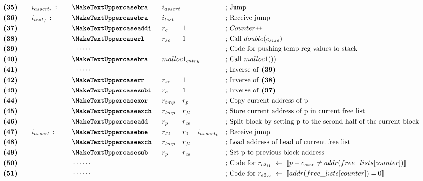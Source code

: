 \begin{figure}[ht]
{\begin{minipage}{\linewidth}
\begin{alignat*}{7}
    &\textbf{(35)}\quad&&i_{assert_t}\ \texttt{:}\quad &&\inst{bra} &&i_{assert} \span\omit\span\quad \span\omit\span\quad && \text{; Jump}\\
    &\textbf{(36)}\quad&&i_{test_f}\ \texttt{:}\quad &&\inst{bra} &&i_{test} \span\omit\span\quad \span\omit\span\quad && \text{; Receive jump}\\
    &\textbf{(37)}\quad&& &&\inst{addi} &&r_{c} && 1 && && \text{; $Counter\texttt{++}$}\\
    &\textbf{(38)}\quad&& &&\inst{rl} &&r_{sc}\ && 1 && && \text{; Call $double(c_{size}$)}\\
    &\textbf{(39)}\quad&& &&\cdots\cdots && && && &&\text{; Code for pushing temp reg values to stack}\\
    &\textbf{(40)}\quad&& &&\inst{bra}\quad &&malloc1_{entry} \span\omit\span\quad \span\omit\span\quad && \text{; Call $malloc1()$)}\\
    &\textbf{(41)}\quad&& &&\cdots\cdots && && && &&\text{; Inverse of \textbf{(39)}}\\
    &\textbf{(42)}\quad&& &&\inst{rr} &&r_{sc}\ && 1 && && \text{; Inverse of \textbf{(38)}}\\
    &\textbf{(43)}\quad&& &&\inst{subi} &&r_{c} && 1 && && \text{; Inverse of \textbf{(37)}}\\
    &\textbf{(44)}\quad&& &&\inst{xor} &&r_{tmp} && r_p && && \text{; Copy current address of p}\\
    &\textbf{(45)}\quad&& &&\inst{exch} &&r_{tmp} && r_{fl} && && \text{; Store current address of p in current free list}\\
    &\textbf{(46)}\quad&& &&\inst{add} &&r_{p} && r_{cs} && && \text{; Split block by setting p to the second half of the current block}\\
    &\textbf{(47)}\quad&&i_{assert}\ \texttt{:}\quad &&\inst{bne} &&r_{t2} && r_0 && i_{assert_t} && \text{; Receive jump}\\
    &\textbf{(48)}\quad&& &&\inst{exch} &&r_{tmp} && r_{fl} && && \text{; Load address of head of current free list}\\
    &\textbf{(49)}\quad&& &&\inst{sub} &&r_{p} && r_{cs} && && \text{; Set p to previous block address}\\
    &\textbf{(50)}\quad&& &&\cdots\cdots && && && &&\text{; Code for $r_{e2_{i1}}\ \leftarrow\ \llbracket p - c_{size} \neq addr(free\_lists[counter])\rrbracket$}\\
    &\textbf{(51)}\quad&& &&\cdots\cdots && && && &&\text{; Code for $r_{e2_{i2}}\ \leftarrow\ \llbracket addr(free\_lists[counter]) = 0 \rrbracket$}\\

\end{alignat*}
\end{minipage}}
\end{figure}
